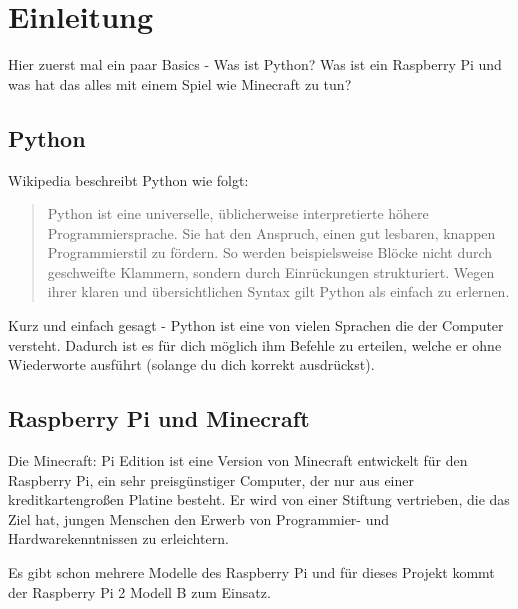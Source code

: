 \section{Einleitung}

Hier zuerst mal ein paar Basics - Was ist Python? Was ist ein Raspberry Pi und was hat das alles mit einem Spiel wie Minecraft zu tun?

\subsection{Python}
Wikipedia beschreibt Python wie folgt:
\begin{quote}
	Python ist eine universelle, üblicherweise interpretierte höhere Programmiersprache. Sie hat den Anspruch, einen gut lesbaren, knappen Programmierstil zu fördern. So werden beispielsweise Blöcke nicht durch geschweifte Klammern, sondern durch Einrückungen strukturiert. Wegen ihrer klaren und übersichtlichen Syntax gilt Python als einfach zu erlernen. \cite{wikipedia_python}
\end{quote}

Kurz und einfach gesagt - Python ist eine von vielen Sprachen die der Computer versteht. Dadurch ist es für dich möglich ihm Befehle zu erteilen, welche er ohne Wiederworte ausführt (solange du dich korrekt ausdrückst).

\subsection{Raspberry Pi und Minecraft}
Die Minecraft: Pi Edition ist eine Version von Minecraft entwickelt für den Raspberry Pi, ein sehr preisgünstiger Computer, der nur aus einer kreditkartengroßen Platine besteht. Er wird von einer Stiftung vertrieben, die das Ziel hat, jungen Menschen den Erwerb von Programmier- und Hardwarekenntnissen zu erleichtern.  \cite{raspi_intro}

Es gibt schon mehrere Modelle des Raspberry Pi und für dieses Projekt kommt der Raspberry Pi 2 Modell B zum Einsatz.
 